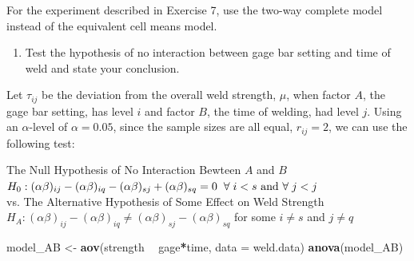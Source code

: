 \documentclass[12pt,]{article}
\newenvironment{Shaded}{\begin{snugshade}}{\end{snugshade}}
\newcommand{\KeywordTok}[1]{\textcolor[rgb]{0.13,0.29,0.53}{\textbf{#1}}}
\newcommand{\DataTypeTok}[1]{\textcolor[rgb]{0.13,0.29,0.53}{#1}}
\newcommand{\StringTok}[1]{\textcolor[rgb]{0.31,0.60,0.02}{#1}}
\newcommand{\OperatorTok}[1]{\textcolor[rgb]{0.81,0.36,0.00}{\textbf{#1}}}
\newcommand{\NormalTok}[1]{#1}
\providecommand{\tightlist}{%
  \setlength{\itemsep}{0pt}\setlength{\parskip}{0pt}}
\begin{document}
For the experiment described in Exercise 7, use the two-way complete
model instead of the equivalent cell means model.

\begin{enumerate}
\def\labelenumi{(\alph{enumi})}
\tightlist
\item
  Test the hypothesis of no interaction between gage bar setting and
  time of weld and state your conclusion.
\end{enumerate}

Let \(\tau_{ij}\) be the deviation from the overall weld strength,
\(\mu\), when factor \(A\), the gage bar setting, has level \(i\) and
factor \(B\), the time of welding, had level \(j\). Using an
\(\alpha\)-level of \(\alpha = 0.05\), since the sample sizes are all
equal, \(r_{ij}=2\), we can use the following test:

\begin{center}
 The Null Hypothesis of No Interaction Bewteen $A$ and $B$  
 $H_0 : (\alpha \beta)_{ij} - (\alpha \beta)_{iq} - (\alpha \beta)_{sj} + (\alpha \beta)_{sq}= 0 \hspace{.2cm }\forall \hspace{.1cm} i<s \text{ and }\forall  \hspace{.1cm} j<j$ \\
 vs. The Alternative Hypothesis of Some Effect on Weld Strength $H_A :  (\alpha \beta)_{ij} - (\alpha \beta)_{iq} \neq (\alpha \beta)_{sj} - (\alpha \beta)_{sq}$ for some $i\neq s$ and $j\neq q$ 
\end{center}

\begin{Shaded}
\end{Shaded}

\begin{Shaded}
\begin{Highlighting}[]
\NormalTok{model_AB <-}\StringTok{ }\KeywordTok{aov}\NormalTok{(strength }\OperatorTok{~}\StringTok{ }\NormalTok{gage}\OperatorTok{*}\NormalTok{time, }\DataTypeTok{data =}\NormalTok{ weld.data)}
\KeywordTok{anova}\NormalTok{(model_AB)}
\end{Highlighting}
\end{Shaded}
\end{document}
